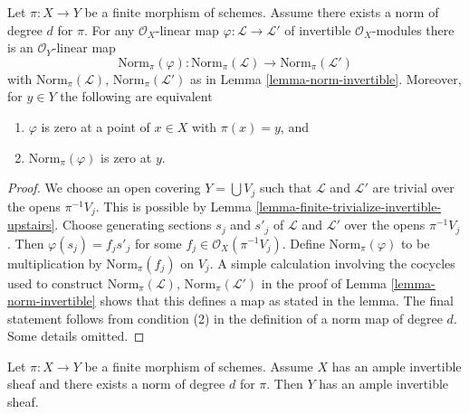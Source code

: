 \begin{lemma}
\label{lemma-norm-map-invertible}
Let $\pi : X \to Y$ be a finite morphism of schemes. Assume there exists
a norm of degree $d$ for $\pi$. For any $\mathcal{O}_X$-linear map
$\varphi : \mathcal{L} \to \mathcal{L}'$
of invertible $\mathcal{O}_X$-modules there is an $\mathcal{O}_Y$-linear
map
$$
\text{Norm}_\pi(\varphi) :
\text{Norm}_\pi(\mathcal{L})
\longrightarrow
\text{Norm}_\pi(\mathcal{L}')
$$
with $\text{Norm}_\pi(\mathcal{L})$, $\text{Norm}_\pi(\mathcal{L}')$
as in Lemma \ref{lemma-norm-invertible}. Moreover, for
$y \in Y$ the following are equivalent
\begin{enumerate}
\item $\varphi$ is zero at a point of $x \in X$ with $\pi(x) = y$, and
\item $\text{Norm}_\pi(\varphi)$ is zero at $y$.
\end{enumerate}
\end{lemma}

\begin{proof}
We choose an open covering $Y = \bigcup V_j$ such that
$\mathcal{L}$ and $\mathcal{L}'$ are trivial over the opens $\pi^{-1}V_j$.
This is possible by
Lemma \ref{lemma-finite-trivialize-invertible-upstairs}.
Choose generating sections
$s_j$ and $s'_j$ of $\mathcal{L}$ and $\mathcal{L}'$
over the opens $\pi^{-1}V_j$. Then $\varphi(s_j) = f_js'_j$
for some $f_j \in \mathcal{O}_X(\pi^{-1}V_j)$.
Define $\text{Norm}_\pi(\varphi)$ to be multiplication
by $\text{Norm}_\pi(f_j)$ on $V_j$. A simple
calculation involving the cocycles used to construct
$\text{Norm}_\pi(\mathcal{L})$, $\text{Norm}_\pi(\mathcal{L}')$
in the proof of Lemma \ref{lemma-norm-invertible}
shows that this defines
a map as stated in the lemma. The final statement follows
from condition (2) in the definition of a norm map of degree $d$.
Some details omitted.
\end{proof}

\begin{lemma}
\label{lemma-norm-ample}
Let $\pi : X \to Y$ be a finite morphism of schemes. Assume $X$ has
an ample invertible sheaf and there exists a norm of degree $d$
for $\pi$. Then $Y$ has an ample invertible sheaf.
\end{lemma}

